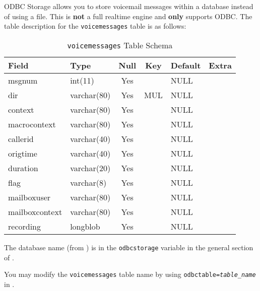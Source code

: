 

ODBC Storage allows you to store voicemail messages within a database 
instead of using a file.  This is \textbf{not} a full realtime engine and 
\textbf{only} supports ODBC.  The table description for the \texttt{voicemessages}
table is as follows:

\begin{table}[h]
\begin{center}
\begin{tabular}{ | l | l | c | c | l | l | }
\hline
Field          & Type        & Null & Key & Default & Extra \\ \hline \hline
msgnum         & int(11)     & Yes  &     & NULL    &       \\ \hline
dir            & varchar(80) & Yes  & MUL & NULL    &       \\ \hline
context        & varchar(80) & Yes  &     & NULL    &       \\ \hline
macrocontext   & varchar(80) & Yes  &     & NULL    &       \\ \hline
callerid       & varchar(40) & Yes  &     & NULL    &       \\ \hline
origtime       & varchar(40) & Yes  &     & NULL    &       \\ \hline
duration       & varchar(20) & Yes  &     & NULL    &       \\ \hline
flag           & varchar(8)  & Yes  &     & NULL    &       \\ \hline
mailboxuser    & varchar(80) & Yes  &     & NULL    &       \\ \hline
mailboxcontext & varchar(80) & Yes  &     & NULL    &       \\ \hline
recording      & longblob    & Yes  &     & NULL    &       \\
\hline
\end{tabular}
\end{center}
\caption{\texttt{voicemessages} Table Schema}
\end{table}

The database name (from ) is in the
\texttt{odbcstorage} variable in the general section of .

You may modify the \texttt{voicemessages} table name by using
\texttt{odbctable=\textit{table\_name}} in .
